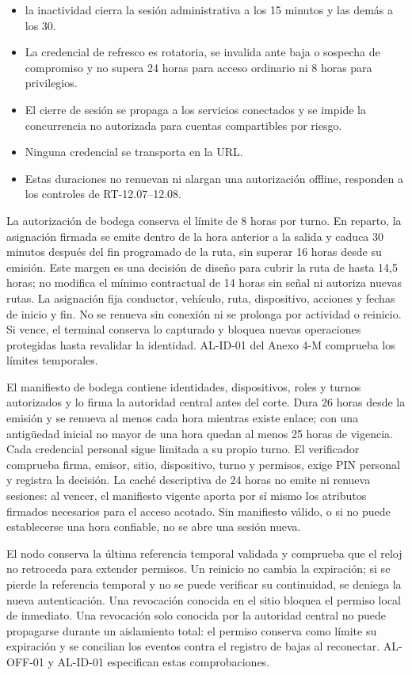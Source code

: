 \begin{itemize}
  \item la inactividad cierra la sesión administrativa a los 15 minutos y las demás a los 30.
  \item La credencial de refresco es rotatoria, se invalida ante baja o sospecha de compromiso y no supera 24 horas para acceso ordinario ni 8 horas para privilegios.
  \item El cierre de sesión se propaga a los servicios conectados y se impide la concurrencia no autorizada para cuentas compartibles por riesgo.
  \item Ninguna credencial se transporta en la URL.
  \item Estas duraciones no renuevan ni alargan una autorización offline, responden a los controles de RT-12.07--12.08.
\end{itemize}

La autorización de bodega conserva el límite de 8 horas por turno. En reparto, la asignación firmada se emite dentro de la hora anterior a la salida y caduca 30 minutos después del fin programado de la ruta, sin superar 16 horas desde su emisión. Este margen es una decisión de diseño para cubrir la ruta de hasta 14,5 horas; no modifica el mínimo contractual de 14 horas sin señal ni autoriza nuevas rutas. La asignación fija conductor, vehículo, ruta, dispositivo, acciones y fechas de inicio y fin. No se renueva sin conexión ni se prolonga por actividad o reinicio. Si vence, el terminal conserva lo capturado y bloquea nuevas operaciones protegidas hasta revalidar la identidad. AL-ID-01 del Anexo 4-M comprueba los límites temporales.

El manifiesto de bodega contiene identidades, dispositivos, roles y turnos autorizados y lo firma la autoridad central antes del corte. Dura 26 horas desde la emisión y se renueva al menos cada hora mientras existe enlace; con una antigüedad inicial no mayor de una hora quedan al menos 25 horas de vigencia. Cada credencial personal sigue limitada a su propio turno. El verificador comprueba firma, emisor, sitio, dispositivo, turno y permisos, exige PIN personal y registra la decisión. La caché descriptiva de 24 horas no emite ni renueva sesiones: al vencer, el manifiesto vigente aporta por sí mismo los atributos firmados necesarios para el acceso acotado. Sin manifiesto válido, o si no puede establecerse una hora confiable, no se abre una sesión nueva.

El nodo conserva la última referencia temporal validada y comprueba que el reloj no retroceda para extender permisos. Un reinicio no cambia la expiración; si se pierde la referencia temporal y no se puede verificar su continuidad, se deniega la nueva autenticación. Una revocación conocida en el sitio bloquea el permiso local de inmediato. Una revocación solo conocida por la autoridad central no puede propagarse durante un aislamiento total: el permiso conserva como límite su expiración y se concilian los eventos contra el registro de bajas al reconectar. AL-OFF-01 y AL-ID-01 especifican estas comprobaciones.

